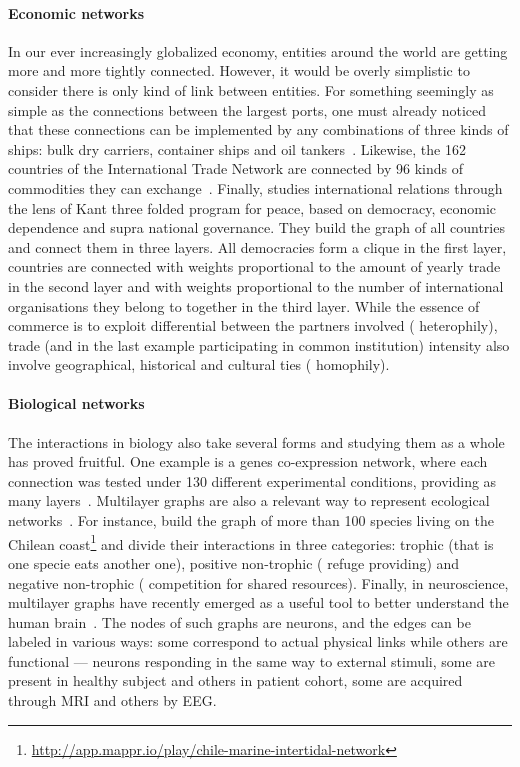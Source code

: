 \paragraph{Economic networks} In our ever increasingly globalized economy, entities around the world
are getting more and more tightly connected. However, it would be overly simplistic to consider
there is only kind of link between entities. For something seemingly as simple as the connections
between the largest  ports, one must already noticed that these connections can be
implemented by any combinations of three kinds of ships: bulk dry carriers, container ships and oil
tankers~\autocite{ports3kindofships10}. Likewise, the 162 countries of the International Trade
Network are connected by 96 kinds of commodities they can exchange~\autocite{worldTradeNetwork10}.
Finally, \textcite{KantPeace15} studies international relations through the lens of Kant three
folded program for peace,  based on democracy, economic dependence and supra national governance.
They build the graph of all countries and connect them in three layers. All democracies form a
clique in the first layer, countries are connected with weights proportional to the amount of yearly
trade in the second layer and with weights proportional to the number of international organisations
they belong to together in the third layer. While the essence of commerce is to exploit differential
between the partners involved (\ie{} heterophily), trade (and in the last example participating in
common institution) intensity also involve geographical, historical and cultural ties (\ie{}
homophily).

\paragraph{Biological networks} The interactions in biology also take several forms and studying
them as a whole has proved fruitful. One example is a genes co-expression network, where each
connection was tested under 130 different experimental conditions, providing as many
layers~\autocite{bioLayerExp11}.
Multilayer graphs are also a relevant way to represent ecological
networks~\autocite{EcologyMultiReview17}. For instance, \textcite{EcoChile15} build the graph of
more than 100 species living on the Chilean
coast\footnote{\url{http://app.mappr.io/play/chile-marine-intertidal-network}} and divide their
interactions in three categories: trophic (that is one specie eats another one), positive
non-trophic (\eg{} refuge providing) and negative non-trophic (\eg{} competition for shared
resources).
Finally, in neuroscience, multilayer graphs have recently emerged as a useful tool to better
understand the human brain~\autocite{Neuroscience16}. The nodes of such graphs are neurons, and the
edges can be labeled in various ways: some correspond to actual physical links while others are
functional ---\ie{} neurons responding in the same way to external stimuli, some are present in
healthy subject and others in patient cohort, some are acquired through MRI and others by EEG.
